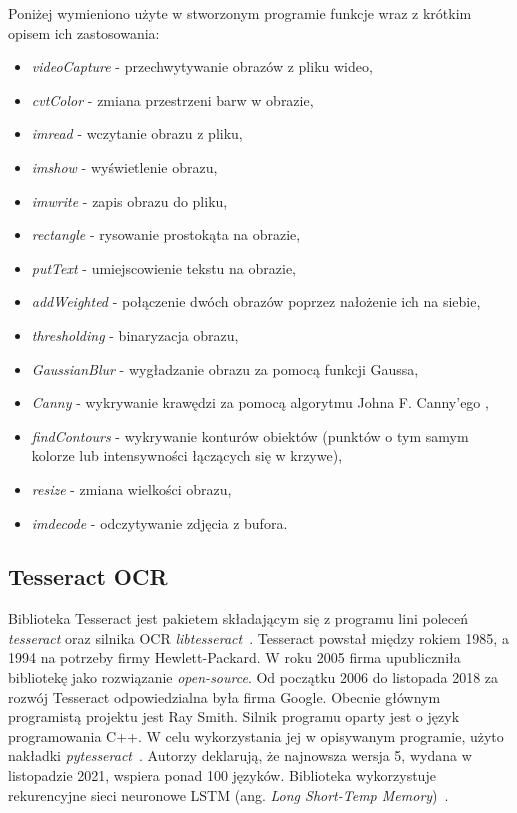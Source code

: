Poniżej wymieniono użyte w stworzonym programie funkcje wraz z krótkim opisem ich zastosowania:
\begin{itemize}
    \item \textit{videoCapture} - przechwytywanie obrazów z pliku wideo,
    \item \textit{cvtColor} - zmiana przestrzeni barw w obrazie,
    \item \textit{imread} - wczytanie obrazu z pliku,
    \item \textit{imshow} - wyświetlenie obrazu,
    \item \textit{imwrite} - zapis obrazu do pliku,
    \item \textit{rectangle} - rysowanie prostokąta na obrazie,
    \item \textit{putText} - umiejscowienie tekstu na obrazie,
    \item \textit{addWeighted} - połączenie dwóch obrazów poprzez nałożenie ich na siebie,
    \item \textit{thresholding} - binaryzacja obrazu,
    \item \textit{GaussianBlur} - wygładzanie obrazu za pomocą funkcji Gaussa,
    \item \textit{Canny} - wykrywanie krawędzi za pomocą algorytmu Johna F. Canny'ego \cite{4767851},
    \item \textit{findContours} - wykrywanie konturów obiektów (punktów o tym samym kolorze lub intensywności łączących się w krzywe),
    \item \textit{resize} - zmiana wielkości obrazu,
    \item \textit{imdecode} - odczytywanie zdjęcia z bufora.
\end{itemize}

\subsection{Tesseract OCR}
Biblioteka Tesseract jest pakietem składającym się z programu lini poleceń \textit{tesseract} oraz silnika OCR \textit{libtesseract}~\cite{tesseract}.
Tesseract powstał między rokiem 1985, a 1994 na potrzeby firmy Hewlett-Packard.
W roku 2005 firma upubliczniła bibliotekę jako rozwiązanie \textit{open-source}.
Od początku 2006 do listopada 2018 za rozwój Tesseract odpowiedzialna była firma Google.
Obecnie głównym programistą projektu jest Ray Smith.
Silnik programu oparty jest o język programowania C++.
W celu wykorzystania jej w opisywanym programie, użyto nakładki \textit{pytesseract}~\cite{pytesseract}.
Autorzy deklarują, że najnowsza wersja 5, wydana w listopadzie 2021, wspiera ponad 100 języków.
Biblioteka wykorzystuje rekurencyjne sieci neuronowe LSTM (ang. \textit{Long Short-Temp Memory})~\cite{lstm}.

